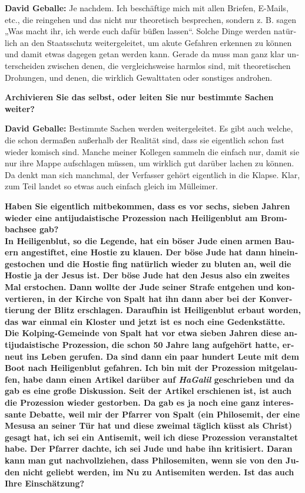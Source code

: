 \begin{otherlanguage}{ngerman}
\textbf{David Geballe:} Je nachdem. Ich beschäftige mich mit allen Briefen, E-Mails, etc., die reingehen und das nicht nur theoretisch besprechen, sondern z. B. sagen „Was macht ihr, ich werde euch dafür büßen lassen“. Solche Dinge werden natürlich an den Staatsschutz weitergeleitet, um akute Gefahren erkennen zu können und damit etwas dagegen getan werden kann. Gerade da muss man ganz klar unterscheiden zwischen denen, die vergleichsweise harmlos sind, mit theoretischen Drohungen, und denen, die wirklich Gewalttaten oder sonstiges androhen. 

\textbf{Archivieren Sie das selbst, oder leiten Sie nur bestimmte Sachen weiter?} 

\textbf{David Geballe:} Bestimmte Sachen werden weitergeleitet. Es gibt auch welche, die schon dermaßen außerhalb der Realität sind, dass sie eigentlich schon fast wieder komisch sind. Manche meiner Kollegen sammeln die einfach nur, damit sie nur ihre Mappe aufschlagen müssen, um wirklich gut darüber lachen zu können. Da denkt man sich manchmal, der Verfasser gehört eigentlich in die Klapse. Klar, zum Teil landet so etwas auch einfach gleich im Mülleimer. 

\textbf{Haben Sie eigentlich mitbekommen, dass es vor sechs, sieben Jahren wieder eine antijudaistische Prozession nach Heiligenblut am Brombachsee gab? \\
In Heiligenblut, so die Legende, hat ein böser Jude einen armen Bauern angestiftet, eine Hostie zu klauen. Der böse Jude hat dann hineingestochen und die Hostie fing natürlich wieder zu bluten an, weil die Hostie ja der Jesus ist. Der böse Jude hat den Jesus also ein zweites Mal erstochen. Dann wollte der Jude seiner Strafe entgehen und konvertieren, in der Kirche von Spalt hat ihn dann aber bei der Konvertierung der Blitz erschlagen. Daraufhin ist Heiligenblut erbaut worden, das war einmal ein Kloster und jetzt ist es noch eine Gedenkstätte. Die Kolping-Gemeinde von Spalt hat vor etwa sieben Jahren diese antijudaistische Prozession, die schon 50 Jahre lang aufgehört hatte, erneut ins Leben gerufen. Da sind dann ein paar hundert Leute mit dem Boot nach Heiligenblut gefahren. Ich bin mit der Prozession mitgelaufen, habe dann einen Artikel darüber auf \textit{HaGalil} geschrieben und da gab es eine große Diskussion. Seit der Artikel erschienen ist, ist auch die Prozession wieder gestorben. Da gab es ja noch eine ganz interessante Debatte, weil mir der Pfarrer von Spalt (ein Philosemit, der eine Mesusa an seiner Tür hat und diese zweimal täglich küsst als Christ) gesagt hat, ich sei ein Antisemit, weil ich diese Prozession veranstaltet habe. Der Pfarrer dachte, ich sei Jude und habe ihn kritisiert. Daran kann man gut nachvollziehen, dass Philosemiten, wenn sie von den Juden nicht geliebt werden, im Nu zu Antisemiten werden. Ist das auch Ihre Einschätzung?}  


\end{otherlanguage}
